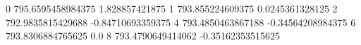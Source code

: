 0 795.6595458984375 1.828857421875
1 793.855224609375 0.0245361328125
2 792.9835815429688 -0.84710693359375
4 793.4850463867188 -0.34564208984375
6 793.8306884765625 0.0
8 793.4790649414062 -0.35162353515625
